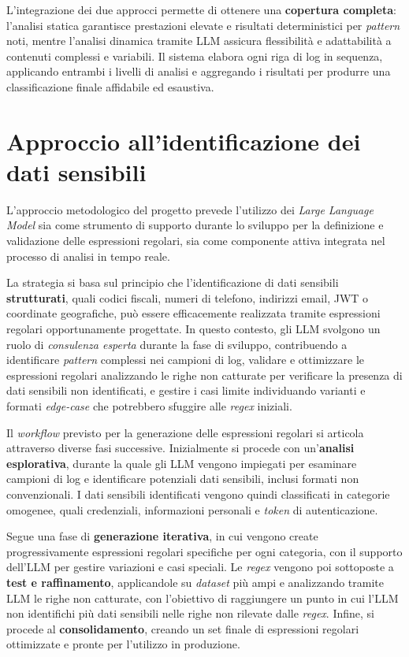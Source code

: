 \documentclass[12pt,twoside]{report}
\begin{document}
L'integrazione dei due approcci permette di ottenere una \textbf{copertura completa}: l'analisi statica garantisce prestazioni elevate e risultati deterministici per \textit{pattern} noti, mentre l'analisi dinamica tramite LLM assicura flessibilità e adattabilità a contenuti complessi e variabili. Il sistema elabora ogni riga di log in sequenza, applicando entrambi i livelli di analisi e aggregando i risultati per produrre una classificazione finale affidabile ed esaustiva.

\section{Approccio all'identificazione dei dati sensibili}
\label{sec:approccio_identificazione}

L'approccio metodologico del progetto prevede l'utilizzo dei \textit{Large Language Model} sia come strumento di supporto durante lo sviluppo per la definizione e validazione delle espressioni regolari, sia come componente attiva integrata nel processo di analisi in tempo reale.

La strategia si basa sul principio che l'identificazione di dati sensibili \textbf{strutturati}, quali codici fiscali, numeri di telefono, indirizzi email, JWT o coordinate geografiche, può essere efficacemente realizzata tramite espressioni regolari opportunamente progettate. In questo contesto, gli LLM svolgono un ruolo di \textit{consulenza esperta} durante la fase di sviluppo, contribuendo a identificare \textit{pattern} complessi nei campioni di log, validare e ottimizzare le espressioni regolari analizzando le righe non catturate per verificare la presenza di dati sensibili non identificati, e gestire i casi limite individuando varianti e formati \textit{edge-case} che potrebbero sfuggire alle \textit{regex} iniziali.

Il \textit{workflow} previsto per la generazione delle espressioni regolari si articola attraverso diverse fasi successive. Inizialmente si procede con un'\textbf{analisi esplorativa}, durante la quale gli LLM vengono impiegati per esaminare campioni di log e identificare potenziali dati sensibili, inclusi formati non convenzionali. I dati sensibili identificati vengono quindi classificati in categorie omogenee, quali credenziali, informazioni personali e \textit{token} di autenticazione.

Segue una fase di \textbf{generazione iterativa}, in cui vengono create progressivamente espressioni regolari specifiche per ogni categoria, con il supporto dell'LLM per gestire variazioni e casi speciali. Le \textit{regex} vengono poi sottoposte a \textbf{test e raffinamento}, applicandole su \textit{dataset} più ampi e analizzando tramite LLM le righe non catturate, con l'obiettivo di raggiungere un punto in cui l'LLM non identifichi più dati sensibili nelle righe non rilevate dalle \textit{regex}. Infine, si procede al \textbf{consolidamento}, creando un set finale di espressioni regolari ottimizzate e pronte per l'utilizzo in produzione.
\end{document}

